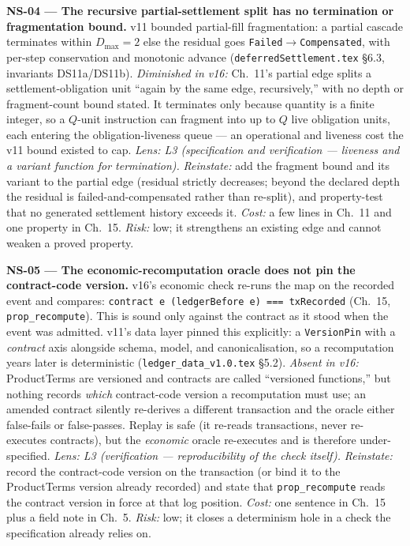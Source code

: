 \documentclass[11pt]{article}
\begin{document}
\textbf{NS-04 --- The recursive partial-settlement split has no termination or
fragmentation bound.}
v11 bounded partial-fill fragmentation: a partial cascade terminates within $D_{\max}=2$ else
the residual goes \texttt{Failed}$\to$\texttt{Compensated}, with per-step conservation and
monotonic advance (\texttt{deferredSettlement.tex} \S6.3, invariants DS11a/DS11b).
\emph{Diminished in v16:} Ch.~11's partial edge splits a settlement-obligation unit ``again by
the same edge, recursively,'' with no depth or fragment-count bound stated. It terminates only
because quantity is a finite integer, so a $Q$-unit instruction can fragment into up to $Q$
live obligation units, each entering the obligation-liveness queue --- an operational and
liveness cost the v11 bound existed to cap. \emph{Lens: L3 (specification and verification ---
liveness and a variant function for termination).} \emph{Reinstate:} add the fragment bound and
its variant to the partial edge (residual strictly decreases; beyond the declared depth the
residual is failed-and-compensated rather than re-split), and property-test that no generated
settlement history exceeds it. \emph{Cost:} a few lines in Ch.~11 and one property in Ch.~15.
\emph{Risk:} low; it strengthens an existing edge and cannot weaken a proved property.

\textbf{NS-05 --- The economic-recomputation oracle does not pin the contract-code version.}
v16's economic check re-runs the map on the recorded event and compares:
\texttt{contract e (ledgerBefore e) === txRecorded} (Ch.~15, \texttt{prop\_recompute}). This is
sound only against the contract as it stood when the event was admitted. v11's data layer pinned
this explicitly: a \texttt{VersionPin} with a \emph{contract} axis alongside schema, model, and
canonicalisation, so a recomputation years later is deterministic
(\texttt{ledger\_data\_v1.0.tex} \S5.2). \emph{Absent in v16:} ProductTerms are versioned and
contracts are called ``versioned functions,'' but nothing records \emph{which} contract-code
version a recomputation must use; an amended contract silently re-derives a different
transaction and the oracle either false-fails or false-passes. Replay is safe (it re-reads
transactions, never re-executes contracts), but the \emph{economic} oracle re-executes and is
therefore under-specified. \emph{Lens: L3 (verification --- reproducibility of the check
itself).} \emph{Reinstate:} record the contract-code version on the transaction (or bind it to
the ProductTerms version already recorded) and state that \texttt{prop\_recompute} reads the
contract version in force at that log position. \emph{Cost:} one sentence in Ch.~15 plus a field
note in Ch.~5. \emph{Risk:} low; it closes a determinism hole in a check the specification
already relies on.
\end{document}
